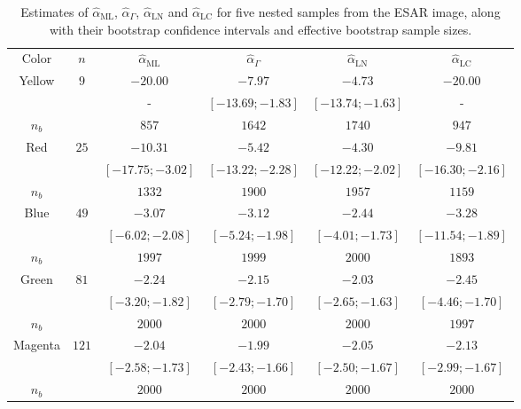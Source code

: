 \documentclass[twocolumn]{svjour3}
\begin{document}
\begin{table}[hbt]
	\centering
	\caption{Estimates of $\widehat{\alpha}_{\text{{ML}}}$, $\widehat{\alpha}_{\Gamma}$, $\widehat{\alpha}_{\text{{LN}}}$ and $\widehat{\alpha}_{\text{{LC}}}$ for five nested samples from the ESAR image, along with their bootstrap confidence intervals and effective bootstrap sample sizes.}\label{TablaCincoMuestras}
	\begin{tabular}{c*5{c}}
		\toprule
		Color       &  $n$    &  $\widehat{\alpha}_{\text{{ML}}}$    &  $\widehat{\alpha}_{\Gamma}$  &  $\widehat{\alpha}_{\text{{LN}}}$ &  $\widehat{\alpha}_{\text{{LC}}}$\\
		\cmidrule(lr){1-6}
		Yellow      & $9$     & $-20.00$      & $-7.97$           & $-4.73$          & $-20.00$\\
		            &	      & -             & $[-13.69;-1.83]$  & $[-13.74;-1.63]$ & -\\
		$n_{b}$    	&         &   $857$       & $1642$            &  $1740$          & $947$         \\ \midrule
		Red         & $25$  & $-10.31$        & $-5.42$           & $-4.30$          & $-9.81$\\
		&                   & $[-17.75;-3.02]$ & $[-13.22;-2.28]$  & $[-12.22;-2.02]$ & $[-16.30;-2.16]$\\
		$n_{b}$    	&       &  $1332$         & $1900$            &  $1957$          &   $1159$       \\ \midrule
		Blue        & $49$  & $-3.07$         & $-3.12$         & $-2.44$         &  $-3.28$\\
		            &       & $[-6.02;-2.08]$ & $[-5.24;-1.98]$ & $[-4.01;-1.73]$ & $[-11.54;-1.89]$\\
		$n_{b}$    	&       & $1997$          &  $1999$         &   $2000$        &  $1893$        \\ \midrule
		Green       & $81$  & $-2.24$         & $-2.15$         & $-2.03$         & $-2.45$\\
	            	&       & $[-3.20;-1.82]$ & $[-2.79;-1.70]$ & $[-2.65;-1.63]$ & $[-4.46;-1.70]$\\
		$n_{b}$    	&       & $2000$          &  $2000$         &  $2000$         & $1997$         \\ \midrule
		Magenta     & $121$ & $-2.04$         & $-1.99$        & $-2.05$          & $-2.13$\\
		            &       & $[-2.58;-1.73]$ & $[-2.43;-1.66]$ & $[-2.50;-1.67]$ & $[-2.99;-1.67]$\\
		$n_{b}$    	&       &  $2000$         &  $2000$         &  $2000$         &  $2000$        \\ \midrule
		\bottomrule
	\end{tabular}
\end{table} 
\end{document}
